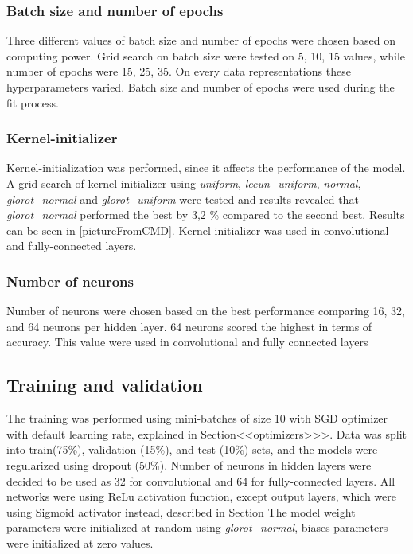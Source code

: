 \subsubsection{Batch size and number of epochs}
Three different values of batch size and number of epochs were chosen based on computing power. Grid search on batch size were tested on 5, 10, 15 values, while number of epochs were 15, 25, 35. On every data representations these hyperparameters varied. Batch size and number of epochs were used during the fit process.

\subsubsection{Kernel-initializer}
Kernel-initialization was performed, since it affects the performance of the model.
A grid search of kernel-initializer using \textit{uniform}, \textit{lecun\_uniform}, \textit{normal}, \textit{glorot\_normal} and \textit{glorot\_uniform} were tested and results revealed that \textit{glorot\_normal} performed the best by 3,2 \% compared to the second best. Results can be seen in \ref{pictureFromCMD}. Kernel-initializer was used in convolutional and fully-connected layers.

\subsubsection{Number of neurons}
Number of neurons were chosen based on the best performance comparing 16, 32, and 64 neurons per hidden layer. 64 neurons scored the highest in terms of accuracy. This value were used in convolutional and fully connected layers

\subsection{Training and validation}
The training was performed using mini-batches of size 10 with SGD optimizer with default learning rate, explained in Section<<optimizers>>>. Data was split into train(75\%), validation (15\%), and test (10\%) sets, and the models were regularized using dropout (50\%). Number of neurons in hidden layers were decided to be used as 32 for convolutional and 64 for fully-connected layers. All networks were using ReLu activation function, except output layers, which were using Sigmoid activator instead, described in Section %
The model weight parameters were initialized at random using \textit{glorot\_normal}, biases parameters were initialized at zero values.

